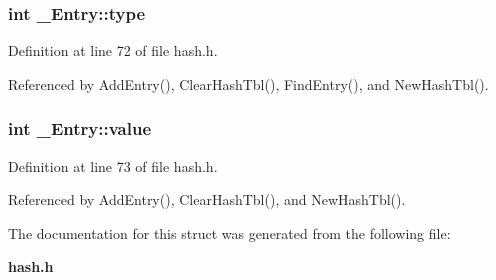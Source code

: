 \subsubsection{\setlength{\rightskip}{0pt plus 5cm}int \bf{\_\-Entry::type}}\label{struct__Entry_8162d72aee08470865e2573aea07c5fb}




Definition at line 72 of file hash.h.

Referenced by Add\-Entry(), Clear\-Hash\-Tbl(), Find\-Entry(), and New\-Hash\-Tbl().
\subsubsection{\setlength{\rightskip}{0pt plus 5cm}int \bf{\_\-Entry::value}}\label{struct__Entry_d46f1d281df91e36255355f335f3c414}




Definition at line 73 of file hash.h.

Referenced by Add\-Entry(), Clear\-Hash\-Tbl(), and New\-Hash\-Tbl().

The documentation for this struct was generated from the following file:\begin{CompactItemize}
\item 
\bf{hash.h}\end{CompactItemize}
